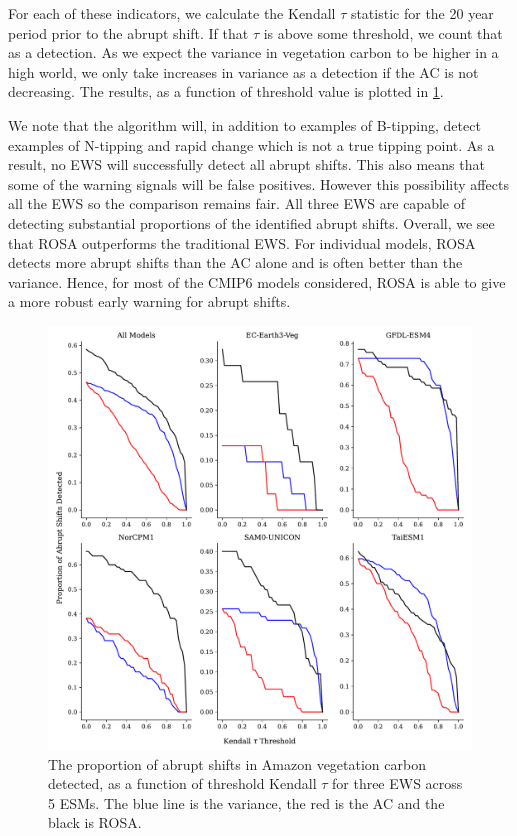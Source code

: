 For each of these indicators, we calculate the Kendall $\tau$ statistic for the
20 year period prior to the abrupt shift. If that $\tau$ is above some threshold, we 
count that as a detection. As we expect the variance in vegetation carbon to be higher 
in a high  world, we only take increases in variance as a detection if
the AC is not decreasing. The results, as a function of threshold value
is plotted in \cref{fig:complex_test}.

We note that the algorithm will, in addition to examples of B-tipping, detect examples
of N-tipping and rapid change which is not a true tipping point. As a result, no 
EWS will successfully detect all abrupt shifts. This also means that some
of the warning signals will be false positives. However this possibility
affects all the EWS so the comparison remains fair. All three EWS are capable
of detecting substantial proportions of the identified abrupt shifts. Overall, we see that ROSA outperforms the traditional EWS.
For individual models,
ROSA detects more abrupt shifts than the AC alone and is often better than the 
variance. Hence, for most of the CMIP6 models considered, ROSA is able to give a more robust
early warning for abrupt shifts.

\begin{figure}
\includegraphics[width=\textwidth,keepaspectratio]{figure4}
\caption[ROSA in CMIP6]{The proportion of abrupt shifts in Amazon vegetation carbon
detected, as a function of threshold Kendall $\tau$ for three EWS across 5 ESMs. The blue line is the variance,
the red is the AC and the black is ROSA.}\label{fig:complex_test}
\end{figure}



